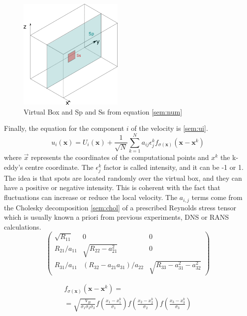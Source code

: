 \documentclass{juliacon}
\begin{document}
\begin{figure}[h]
     \centering
         \includegraphics[width=0.45\textwidth]{Images/virtual_box.png}
         \caption{Virtual Box and Sp and Ss from equation \eqref{sem:num}}
            \label{figsem:Vbox_SsSp}
\end{figure}


Finally, the equation for the component $i$ of the velocity is \eqref{sem:ui}.
\begin{equation}
u_i(\boldsymbol{x})=U_i(\boldsymbol{x})+\frac{1}{\sqrt{N}} \sum_{k=1}^N a_{i j} \epsilon_j^k f_{\sigma(\boldsymbol{x})}\left(\boldsymbol{x}-\boldsymbol{x}^k\right)
\label{sem:ui}
\end{equation}
where $\Vec{x}$ represents the coordinates of the computational points and $x^k$ the k-eddy's centre coordinate. The $\epsilon_j^k$ factor is called intensity, and it can be -1 or 1. The idea is that spots are located randomly over the virtual box, and they can have a positive or negative intensity. This is coherent with the fact that fluctuations can increase or reduce the local velocity. The $a_{i,j}$ terms come from the Cholesky decomposition \eqref{sem:chol} of a prescribed Reynolds stress tensor which is usually known a priori from previous experiments, DNS or RANS calculations.
\begin{equation}
\left(\begin{array}{ccc}
\sqrt{R_{11}} & 0 & 0 \\
R_{21} / a_{11} & \sqrt{R_{22}-a_{21}^2} & 0 \\
R_{31} / a_{11} & \left(R_{32}-a_{21} a_{31}\right) / a_{22} & \sqrt{R_{33}-a_{31}^2-a_{32}^2}
\end{array}\right)
\label{sem:chol}
\end{equation}

\begin{equation}
\begin{multlined}
f_{\sigma(\boldsymbol{x})}\left(\boldsymbol{x}-\boldsymbol{x}^k\right)= \\
=\sqrt{\frac{V_B}{\sigma_1 \sigma_2 \sigma_3}} f\left(\frac{x_1-x_1^k}{\sigma_1}\right) f\left(\frac{x_2-x_2^k}{\sigma_2}\right) f\left(\frac{x_3-x_3^k}{\sigma_3}\right)
\end{multlined}
\label{sem:fsigma}
\end{equation}
\end{document}
